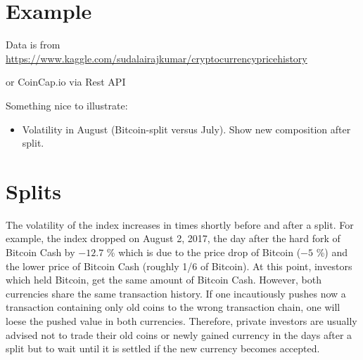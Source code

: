 \documentclass[11pt]{article}
\begin{document}
\section{Example}

Data is from \href{https://www.kaggle.com/sudalairajkumar/cryptocurrencypricehistory}{https://www.kaggle.com/sudalairajkumar/cryptocurrencypricehistory}

or CoinCap.io via Rest API

Something nice to illustrate:
\begin{itemize}
  \item Volatility in August (Bitcoin-split versus July). Show new composition after split.
\end{itemize}

\section{Splits}

The volatility of the index increases in times shortly before and after a split. For example, the index dropped on August 2, 2017, the day after the hard fork of Bitcoin Cash by $-12.7$ \% which is due to the price drop of Bitcoin ($-5$ \%) and the lower price of Bitcoin Cash (roughly 1/6 of Bitcoin). At this point, investors which held Bitcoin, get the same amount of Bitcoin Cash. However, both currencies share the same transaction history. If one incautiously pushes now a transaction containing only old coins to the wrong transaction chain, one will loese the pushed value in both currencies. Therefore, private investors are usually advised not to trade their old coins or newly gained currency in the days after a split but to wait until it is settled if the new currency becomes accepted.




\end{document}
